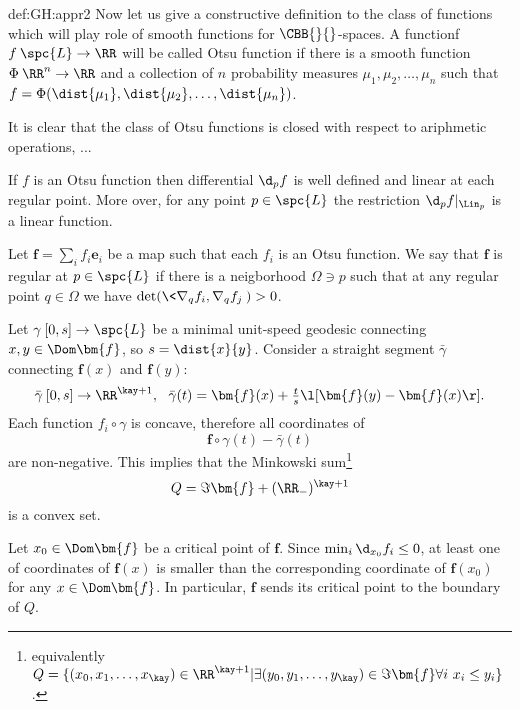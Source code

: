 {\begin{subthm}{def:GH:appr2}
Now let us give a constructive definition to the class of functions which will play role of smooth functions for $\CBB{}{}$-spaces.
A functionf $f\:\spc{L}\to \RR$ will be called Otsu function if there is a smooth function $\Phi\:\RR^n\to\RR$ and a collection of $n$ probability measures $\mu_1,\mu_2,\dots,\mu_n$ such that $f=\Phi(\dist {\mu_1},\dist {\mu_2},\dots,\dist {\mu_n})$. 

It is clear that the class of Otsu functions is closed with respect to ariphmetic operations, ...

If $f$ is an Otsu function then differential $\d_pf$ is well defined and linear at each regular point.
More over, for any point $p\in \spc{L}$ the restriction $\d_pf|_{\Lin_p}$ is a linear function.

Let $\bm{f}=\sum_if_i\bm{e}_i$ be a map such that each $f_i$ is an Otsu function.
We say that $\bm{f}$ is regular at $p\in \spc{L}$ if there is a neigborhood $\Omega\ni p$ such that at any regular point $q\in \Omega$ we have $\det(\<\nabla_q f_i,\nabla_q f_j\>)>0$.














Let $\gamma\:[0,s]\to \spc{L}$ be a minimal unit-speed geodesic connecting $x,y\in \Dom\bm{f}$, so $s=\dist{x}{y}$.
Consider a straight segment $\bar\gamma$ connecting $\bm{f}(x)$ and $\bm{f}(y)$: 
$$\bar\gamma\:[0,s]\to\RR^{\kay+1},\ \  \bar\gamma(t)=\bm{f}(x)+\tfrac
t s\l[\bm{f}(y)-\bm{f}(x)\r].$$
Each function $f_i\circ\gamma$ is concave, therefore all coordinates of 
$$\bm{f}\circ\gamma(t)-\bar\gamma(t)$$ 
are non-negative.
This implies that the Minkowski sum\footnote{equivalently 
$Q=\{(x_0,x_1,\dots,x_\kay)\in\RR^{\kay+1}|\exists(y_0,y_1,\dots,y_\kay)\in
\Im\bm{f}\forall i\  x_i\le y_i\}$.} 
$$Q=\Im\bm{f}+(\RR_-)^{\kay+1}$$ 
is a convex set.

Let $x_0\in \Dom\bm{f}$ be a critical point of $\bm{f}$. 
Since $\min_i\d_{x_0}f_i\le 0$, at least one of coordinates
of $\bm{f}(x)$ is smaller than the corresponding coordinate of $\bm{f}(x_0)$ for any $x\in\Dom\bm{f}$.
In particular, $\bm{f}$ sends its critical point to the boundary of $Q$.


\end{subthm}}
